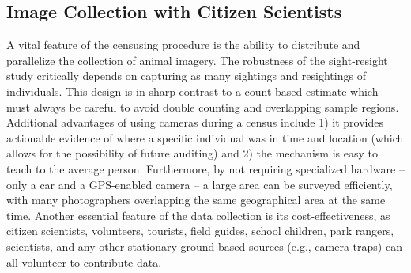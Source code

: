 \subsection{Image Collection with Citizen Scientists}

A vital feature of the censusing procedure is the ability to distribute and parallelize the collection of animal imagery.  The robustness of the sight-resight study critically depends on capturing as many sightings and resightings of individuals.  This design is in sharp contrast to a count-based estimate which must always be careful to avoid double counting and overlapping sample regions.  Additional advantages of using cameras during a census include 1) it provides actionable evidence of where a specific individual was in time and location (which allows for the possibility of future auditing) and 2) the mechanism is easy to teach to the average person. Furthermore, by not requiring specialized hardware -- only a car and a GPS-enabled camera -- a large area can be surveyed efficiently, with many photographers overlapping the same geographical area at the same time. Another essential feature of the data collection is its cost-effectiveness, as citizen scientists, volunteers, tourists, field guides, school children, park rangers, scientists, and any other stationary ground-based sources (e.g., camera traps) can all volunteer to contribute data.

